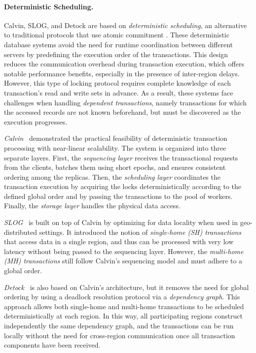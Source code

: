 \documentclass{article}
\begin{document}
\paragraph{Deterministic Scheduling.}
Calvin, SLOG, and Detock are based on \textit{deterministic scheduling}, an alternative to traditional protocols that use atomic commitment \cite{thomson2010case}. These deterministic database systems avoid the need for runtime coordination between different servers by predefining the execution order of the transactions. This design reduces the communication overhead during transaction execution, which offers notable performance benefits, especially in the presence of inter-region delays. However, this type of locking protocol requires complete knowledge of each transaction's read and write sets in advance. As a result, these systems face challenges when handling \textit{dependent transactions}, namely transactions for which the accessed records are not known beforehand, but must be discovered as the execution progresses.

\textit{Calvin}~\cite{thomson2012calvin} demonstrated the practical feasibility of deterministic transaction processing with near-linear scalability. The system is organized into three separate layers. First, the \textit{sequencing layer} receives the transactional requests from the clients, batches them using short epochs, and ensures consistent ordering among the replicas. Then, the \textit{scheduling layer} coordinates the transaction execution by acquiring the locks deterministically according to the defined global order and by passing the transactions to the pool of workers. Finally, the \textit{storage layer} handles the physical data access.

\textit{SLOG}~\cite{ren2019slog} is built on top of Calvin by optimizing for data locality when used in geo-distributed settings. It introduced the notion of \textit{single-home (SH) transactions} that access data in a single region, and thus can be processed with very low latency without being passed to the sequencing layer. However, the \textit{multi-home (MH) transactions} still follow Calvin's sequencing model and must adhere to a global order.

\textit{Detock}~\cite{nguyen2023detock} is also based on Calvin's architecture, but it removes the need for global ordering by using a deadlock resolution protocol via a \textit{dependency graph}. This approach allows both single-home and multi-home transactions to be scheduled deterministically at each region. In this way, all participating regions construct independently the same dependency graph, and the transactions can be run locally without the need for cross-region communication once all transaction components have been received.
\end{document}
